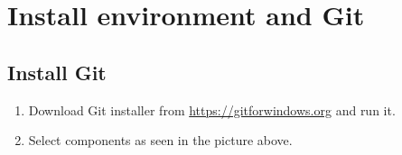 \documentclass[a4paper,12pt]{book}
\begin{document}
\chapter{Install environment and Git}
\section{Install Git}
\begin{enumerate}
	\item Download Git installer from \url{https://gitforwindows.org} and run it.
	\item \begin{minipage}[t]{\linewidth}
		\raggedright
		\medskip	
	\end{minipage}
	Select components as seen in the picture above.
	

\end{enumerate}
\end{document}
